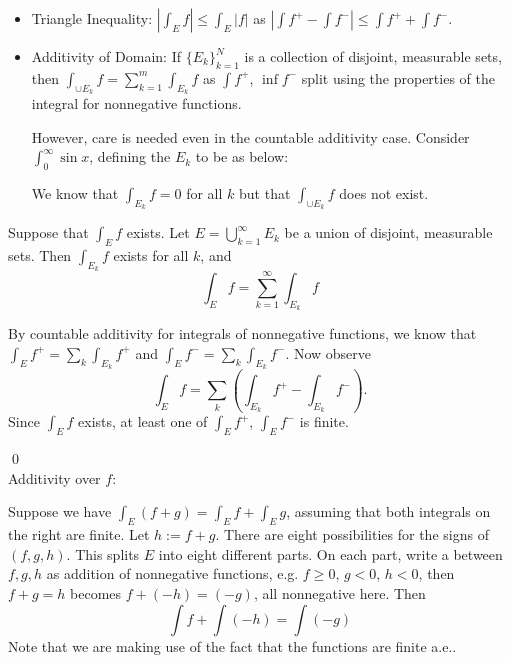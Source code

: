 \begin{itemize}
\item Triangle Inequality: $\left| \int_E f \right| \leq \int_E |f|$ as $\left| \int f^+ - \int f^- \right| \leq \int f^+ + \int f^-$.

\item Additivity of Domain: If $\{E_k\}_{k=1}^N$ is a collection of disjoint, measurable sets, then $\int_{\cup E_k} f = \sum_{k=1}^m \int_{E_k} f$ as $\int f^+$, $\inf f^-$ split using the properties of the integral for nonnegative functions. 

However, care is needed even in the countable additivity case. Consider $\int_0^\infty \sin x$, defining the $E_k$ to be as below:


We know that $\int_{E_k} f= 0$ for all $k$ but that $\int_{\cup E_k} f$ does not exist. 
\end{itemize}


\begin{lem}
Suppose that $\int_E f$ exists. Let $E= \bigcup_{k=1}^\infty E_k$ be a union of disjoint, measurable sets. Then $\int_{E_k} f$ exists for all $k$, and 
	\[
	\int_E f= \sum_{k=1}^\infty \int_{E_k} f
	\]
\end{lem}

\pf By countable additivity for integrals of nonnegative functions, we know that $\int_E f^+= \sum_k \int_{E_k} f^+$ and $\int_E f^-= \sum_k \int_{E_k} f^-$. Now observe
	\[
	\int_E f = \sum_k \left( \int_{E_k} f^+ - \int_{E_k} f^- \right).
	\]
Since $\int_E f$ exists, at least one of $\int_E f^+$, $\int_E f^-$ is finite. 


\qed \\




Additivity over $f$:

Suppose we have $\int_E (f+g)= \int_E f + \int_E g$, assuming that both integrals on the right are finite. Let $h:= f+g$. There are eight possibilities for the signs of $(f,g,h)$. This splits $E$ into eight different parts. On each part, write a between $f,g,h$ as addition of nonnegative functions, e.g. $f \geq 0$, $g<0$, $h<0$, then $f+g=h$ becomes $f+(-h)=(-g)$, all nonnegative here. Then
	\[
	\int f + \int (-h) = \int (-g)
	\]
Note that we are making use of the fact that the functions are finite a.e.. 



